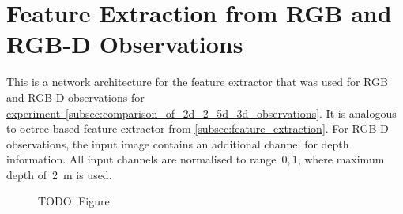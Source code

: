 \section{Feature Extraction from RGB and RGB-D Observations}\label{app:feature_extraction_from_rgb_and_rgbd_observations}

This is a network architecture for the feature extractor that was used for RGB and RGB-D observations for \hyperref[subsec:comparison_of_2d_2_5d_3d_observations]{experiment~\ref*{subsec:comparison_of_2d_2_5d_3d_observations}}. It is analogous to octree-based feature extractor from \autoref{subsec:feature_extraction}. For RGB-D observations, the input image contains an additional channel for depth information. All input channels are normalised to range~\(0, 1\), where maximum depth of~2~m is used.

\capstartfalse%
\begin{figure}[ht]
    \centering
    TODO: Figure
\end{figure}
\capstarttrue%
